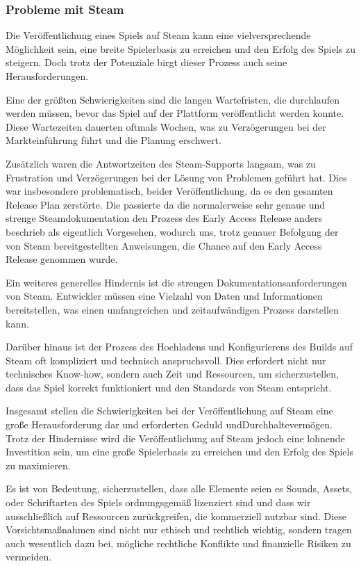  \subsubsection{Probleme mit Steam}\label{subsubsec:Steam-Herausforderungen}
Die Veröffentlichung eines Spiels auf Steam kann eine vielversprechende Möglichkeit sein, eine breite Spielerbasis zu erreichen und den Erfolg des Spiels zu steigern. Doch trotz der Potenziale birgt dieser Prozess auch seine Herausforderungen.

Eine der größten Schwierigkeiten sind die langen Wartefristen, die durchlaufen werden müssen, bevor das Spiel auf der Plattform veröffentlicht werden konnte. Diese Wartezeiten dauerten oftmals Wochen, was zu Verzögerungen bei der Markteinführung führt und die Planung erschwert.

Zusätzlich waren die Antwortzeiten des Steam-Supports langsam, was zu Frustration und Verzögerungen bei der Lösung von Problemen geführt hat. Dies war insbesondere problematisch, beider Veröffentlichung, da es den gesamten Release Plan zerstörte.
Die passierte da die normalerweise sehr genaue und strenge Steamdokumentation den Prozess des Early Access Release anders beschrieb als eigentlich Vorgesehen, wodurch uns, trotz genauer Befolgung der von Steam bereitgestellten Anweisungen, die Chance auf den Early Access Release genommen wurde.

Ein weiteres generelles Hindernis ist die strengen Dokumentationsanforderungen von Steam. Entwickler müssen eine Vielzahl von Daten und Informationen bereitstellen, was einen umfangreichen und zeitaufwändigen Prozess darstellen kann.

Darüber hinaus ist der Prozess des Hochladens und Konfigurierens des Builds auf Steam oft kompliziert und technisch anspruchsvoll. Dies erfordert nicht nur technisches Know-how, sondern auch Zeit und Ressourcen, um sicherzustellen, dass das Spiel korrekt funktioniert und den Standards von Steam entspricht.

Insgesamt stellen die Schwierigkeiten bei der Veröffentlichung auf Steam eine große Herausforderung dar und erforderten Geduld undDurchhaltevermögen.
Trotz der Hindernisse wird die Veröffentlichung auf Steam jedoch eine lohnende Investition sein, um eine große Spielerbasis zu erreichen und den Erfolg des Spiels zu maximieren.



Es ist von Bedeutung, sicherzustellen, dass alle Elemente seien es Sounds, Assets, oder Schriftarten des Spiels ordnungsgemäß lizenziert sind und dass wir ausschließlich auf Ressourcen zurückgreifen, die kommerziell nutzbar sind.
Diese Vorsichtsmaßnahmen sind nicht nur ethisch und rechtlich wichtig, sondern tragen auch wesentlich dazu bei, mögliche rechtliche Konflikte und finanzielle Risiken zu vermeiden.

%

\renewcommand{\kapitelautor}{}